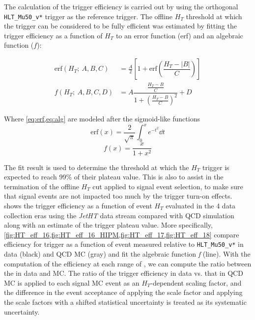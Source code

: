 The calculation of the trigger efficiency is carried out by using the orthogonal \verb|HLT_Mu50_v*| trigger as the reference trigger. The offline $H_T$ threshold at which the trigger can be considered to be fully efficient was estimated by fitting the trigger efficiency as a function of $H_T$ to an error function (erf) and an algebraic function ($f$):

\begin{align}
	\text{erf}(H_T ;\ A,B,C) & = \frac A2 \left[1+ \text{erf}\left(\dfrac{H_T - |B|}{C}\right) \right]\label{eq:erf} \\
	f(H_T ;\ A,B,C,D)        & = A \dfrac{\frac{H_T - B}{C}}{1+ \left(\frac{H_T - B}{C}\right)^2} + D \label{eq:alg}
\end{align}

Where \cref{eq:erf,eq:alg} are modeled after the sigmoid-like functions
\[
	\text{erf}(x) = \frac{2}{\sqrt{\pi}} \int_0^x e^{-t^2} \dd{t}
\]
\[
	f(x)=\frac{x}{1+x^{2}}
\]


The fit result is used to determine the threshold at which the $H_T$ trigger is expected to reach 99\% of their plateau value. This is also to assist in the termination of the offline $H_T$ cut applied to signal event selection, to make sure that signal events are not impacted too much by the trigger turn-on effects.  shows the trigger efficiency as a function of event $H_T$ evaluated in the 4 data collection eras using the \textit{JetHT} data stream compared with QCD simulation along with an estimate of the trigger plateau value.
More specifically, \cref{fig:HT_eff_16,fig:HT_eff_16_HIPM,fig:HT_eff_17,fig:HT_eff_18} compare efficiency for \HT trigger as a function of event \HT measured relative to \verb|HLT_Mu50_v*| in data (black) and QCD MC (gray) and fit the algebraic function \textit{f} (line). With the computation of the efficiency at each range of \HT, we can compute the ratio between the \HT in data and MC. The ratio of the trigger efficiency in data vs. that in QCD MC is applied to each signal MC event as an $H_T$-dependent scaling factor, and the difference in the event acceptance of applying the scale factor and applying the scale factors with a shifted statistical uncertainty is treated as its systematic uncertainty.

